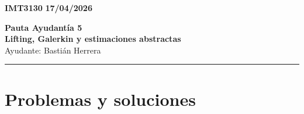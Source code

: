 \documentclass[11pt]{article}
\begin{document}
    \begin{flushleft}
        \small
        \vspace{1pt}
        \textbf{IMT3130} \hfill
        \textbf{17/04/2026}
    \end{flushleft}
    \begin{center}
        \LARGE\textbf{Pauta Ayudantía 5}\\
        \vspace{3pt}
        \normalsize\textbf{Lifting, Galerkin y estimaciones abstractas}\\
        \normalsize Ayudante: Bastián Herrera 
        \rule{\textwidth}{0.05mm}
    \end{center}

\section*{Problemas y soluciones}
\end{document}
